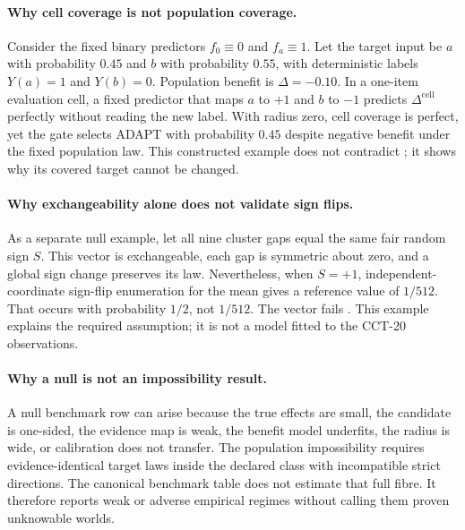 \paragraph{Why cell coverage is not population coverage.}
Consider the fixed binary predictors $f_0\equiv0$ and $f_a\equiv1$. Let the target input be $a$
with probability $0.45$ and $b$ with probability $0.55$, with deterministic labels $Y(a)=1$ and
$Y(b)=0$. Population benefit is $\Delta=-0.10$. In a one-item evaluation cell, a fixed predictor
that maps $a$ to $+1$ and $b$ to $-1$ predicts $\Delta^{\mathrm{cell}}$ perfectly without reading
the new label. With radius zero, cell coverage is perfect, yet the gate selects ADAPT with
probability $0.45$ despite negative benefit under the fixed population law. This constructed example
does not contradict ; it shows why its covered target cannot be changed.

\paragraph{Why exchangeability alone does not validate sign flips.}
As a separate null example, let all nine cluster gaps equal the same fair random sign $S$.
This vector is exchangeable, each gap is symmetric about zero, and a global sign change preserves
its law. Nevertheless, when $S=+1$, independent-coordinate sign-flip enumeration for the mean gives
a reference value of $1/512$. That occurs with probability $1/2$, not $1/512$. The vector fails
. This example explains the required assumption; it is not a
model fitted to the CCT-20 observations.

\paragraph{Why a null is not an impossibility result.}
A null benchmark row can arise because the true effects are small, the candidate is one-sided, the
evidence map is weak, the benefit model underfits, the radius is wide, or calibration does not
transfer. The population impossibility requires evidence-identical target laws inside the declared
class with incompatible strict directions. The canonical benchmark table does not estimate that
full fibre. It therefore reports weak or adverse empirical regimes without calling them proven
unknowable worlds.


